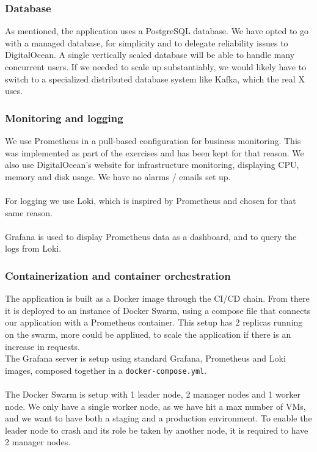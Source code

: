 \subsubsection{Database}
As mentioned, the application uses a PostgreSQL database. We have opted to go with a managed database, for simplicity and to delegate reliability issues to DigitalOcean. A single vertically scaled database will be able to handle many concurrent users. If we needed to scale up substantiably, we would likely have to switch to a specialized distributed database system like Kafka, which the real X uses\cite{kafka}.

\subsubsection{Monitoring and logging}
We use Prometheus in a pull-based configuration for business monitoring. This was implemented as part of the exercises and has been kept for that reason. We also use DigitalOcean's website for infrastructure monitoring, displaying CPU, memory and disk usage. We have no alarms / emails set up.\\\\
For logging we use Loki, which is inspired by Prometheus and chosen for that same reason\cite{Loki}.\\\\
Grafana is used to display Prometheus data as a dashboard, and to query the logs from Loki.

\subsubsection{Containerization and container orchestration}
The application is built as a Docker image through the CI/CD chain. From there it is deployed to an instance of Docker Swarm, using a compose file that connects our application with a Prometheus container. This setup has 2 replicas running on the swarm, more could be appliued, to scale the application if there is an increase in requests.\\
The Grafana server is setup using standard Grafana, Prometheus and Loki images, composed together in a \texttt{docker-compose.yml}.\\\\
The Docker Swarm is setup with 1 leader node, 2 manager nodes and 1 worker node. We only have a single worker node, as we have hit a max number of VMs, and we want to have both a staging and a production environment. To enable the leader node to crash and its role be taken by another node, it is required to have 2 manager nodes.\\\\

